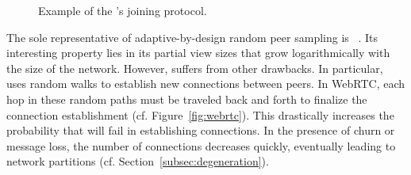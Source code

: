 \begin{figure*}
  \centering
  \hspace{8pt}
  \hspace{8pt}
  \caption{\label{fig:joiningexample}Example of the \SPRAY's joining
    protocol.}
\end{figure*}

The sole representative of adaptive-by-design random peer sampling is
\SCAMP~\cite{ganesh2003peer}. Its interesting property lies in its
partial view sizes that grow logarithmically with the size of the
network. However, \SCAMP suffers from other drawbacks.
In particular, \SCAMP uses random walks to establish new connections
between peers. In WebRTC, each hop in these random paths must be
traveled back and forth to finalize the connection establishment
(cf. Figure~\ref{fig:webrtc}). This drastically increases the
probability that \SCAMP will fail in establishing connections. In the
presence of churn or message loss, the number of connections decreases
quickly,  eventually leading to network partitions
(cf. Section~\ref{subsec:degeneration}).




